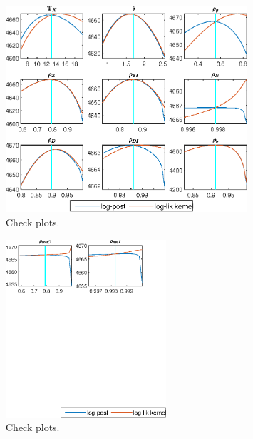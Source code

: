 \begin{figure}[H]
\centering 
\includegraphics[width=0.80\textwidth]{BRS_sectoral/graphs/BRS_sectoral_CheckPlots3}
\caption{Check plots.}\label{Fig:CheckPlots:3}
\end{figure}
 
\begin{figure}[H]
\centering 
\includegraphics[width=0.53\textwidth]{BRS_sectoral/graphs/BRS_sectoral_CheckPlots4}
\caption{Check plots.}\label{Fig:CheckPlots:4}
\end{figure}
 
